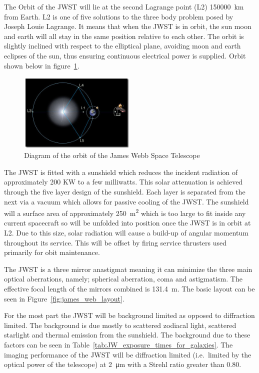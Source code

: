 	The Orbit of the JWST will lie at the second Lagrange point (L2) \SI{150000}{\kilo\metre} from Earth. L2 is one of five solutions to the three body problem posed by Joseph Louie Lagrange. It means that when the JWST is in orbit, the sun moon and earth will all stay in the same position relative to each other. The orbit is slightly inclined with respect to the elliptical plane, avoiding moon and earth eclipses of the sun, thus ensuring continuous electrical power is supplied. Orbit shown below in figure~\ref{fig:james_web_orbit}\cite{primary_mirror_construction}.
	\begin{figure}[!htbp]
		\centering
			\includegraphics[width=0.5\textwidth]{../Images/JWST_orbit_L2.jpeg}
		\caption{Diagram of the orbit of the James Webb Space Telescope\label{fig:james_web_orbit}}
	\end{figure}

	The JWST is fitted with a sunshield which reduces the incident radiation of approximately 200 KW to a few milliwatts. This solar attenuation is achieved through the five layer design of the sunshield. Each layer is separated from the next via a vacuum which allows for passive cooling of the JWST. The sunshield will a surface area of approximately \SI{250}{\square\metre} which is too large to fit inside any current spacecraft so will be unfolded into position once the JWST is in orbit at L2. Due to this size, solar radiation will cause a build-up of angular momentum throughout its service. This will be offset by firing service thrusters used primarily for obit maintenance.

	The JWST is a three mirror anastigmat meaning it can minimize the three main optical aberrations, namely; spherical aberration, coma and astigmatism. The effective focal length of the mirrors combined is \SI{131.4}{\metre}. The basic layout can be seen in Figure~\ref{fig:james_web_layout}.

	For the most part the JWST will be background limited as opposed to diffraction limited. The background is due mostly to scattered zodiacal light, scattered starlight and thermal emission from the sunshield. The background due to these factors can be seen in Table~\ref{tab:JW_exposure_times_for_galaxies}. The imaging performance of the JWST will be diffraction limited (i.e.\ limited by the optical power of the telescope) at \SI{2}{\micro\metre} with a Strehl ratio greater than 0.80.

